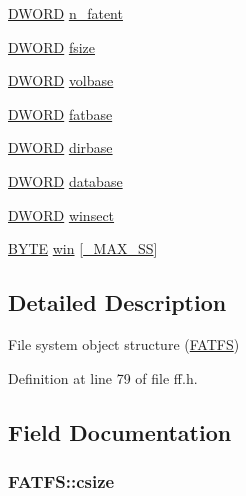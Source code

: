 \begin{DoxyCompactItemize}
\item 
\hyperlink{integer_8h_ad342ac907eb044443153a22f964bf0af}{D\-W\-O\-R\-D} \hyperlink{structFATFS_a8da50eeba6469bc20d60ca0cf9a1307c}{n\-\_\-fatent}
\item 
\hyperlink{integer_8h_ad342ac907eb044443153a22f964bf0af}{D\-W\-O\-R\-D} \hyperlink{structFATFS_a53e9560659f14e66f306c2c444198bf3}{fsize}
\item 
\hyperlink{integer_8h_ad342ac907eb044443153a22f964bf0af}{D\-W\-O\-R\-D} \hyperlink{structFATFS_a8f0ca578755749d204f59dc83f1a7649}{volbase}
\item 
\hyperlink{integer_8h_ad342ac907eb044443153a22f964bf0af}{D\-W\-O\-R\-D} \hyperlink{structFATFS_a848fba02c4aabe02ef2984e578f33d64}{fatbase}
\item 
\hyperlink{integer_8h_ad342ac907eb044443153a22f964bf0af}{D\-W\-O\-R\-D} \hyperlink{structFATFS_a3f72fd998dbcce4652a85a81fe944bc4}{dirbase}
\item 
\hyperlink{integer_8h_ad342ac907eb044443153a22f964bf0af}{D\-W\-O\-R\-D} \hyperlink{structFATFS_a5b6c0bc2e9fd2ae8ef714210a74a2d5d}{database}
\item 
\hyperlink{integer_8h_ad342ac907eb044443153a22f964bf0af}{D\-W\-O\-R\-D} \hyperlink{structFATFS_ac60e69c00e6bf7c25febfbac4dc1476b}{winsect}
\item 
\hyperlink{integer_8h_a4ae1dab0fb4b072a66584546209e7d58}{B\-Y\-T\-E} \hyperlink{structFATFS_a7cc35a593465e727ab87723c14610644}{win} \mbox{[}\hyperlink{ffconf_8h_ac271b697378912f17132cb9c7d0de024}{\-\_\-\-M\-A\-X\-\_\-\-S\-S}\mbox{]}
\end{DoxyCompactItemize}


\subsection{Detailed Description}
File system object structure (\hyperlink{structFATFS}{F\-A\-T\-F\-S}) 

Definition at line 79 of file ff.\-h.



\subsection{Field Documentation}
\hypertarget{structFATFS_a504a1175f6dcc9a854b9da94463bd108}{
\subsubsection[{csize}]{ F\-A\-T\-F\-S\-::csize}}\label{structFATFS_a504a1175f6dcc9a854b9da94463bd108}


